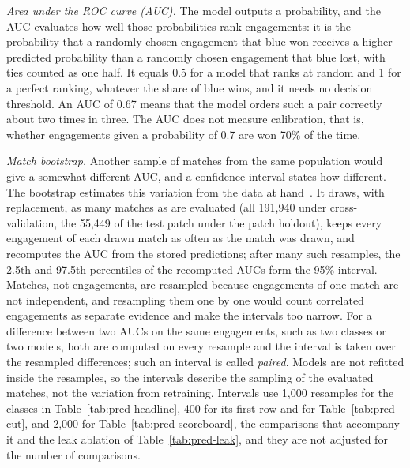 \emph{Area under the ROC curve (AUC).} The model outputs a probability, and the AUC evaluates how well
those probabilities rank engagements: it is the probability that a randomly chosen engagement that blue
won receives a higher predicted probability than a randomly chosen engagement that blue lost, with ties
counted as one half. It equals 0.5 for a model that ranks at random and 1 for a perfect ranking,
whatever the share of blue wins, and it needs no decision threshold. An AUC of 0.67 means that the model
orders such a pair correctly about two times in three. The AUC does not measure calibration, that is,
whether engagements given a probability of 0.7 are won 70\% of the time.

\emph{Match bootstrap.} Another sample of matches from the same population would give a somewhat
different AUC, and a confidence interval states how different. The bootstrap estimates this variation
from the data at hand~\cite{efron1993bootstrap}. It draws, with replacement, as many matches as are
evaluated (all 191,940 under cross-validation, the 55,449 of the test patch under the patch holdout),
keeps every engagement of each drawn match as often as the match was drawn, and recomputes the AUC from
the stored predictions; after many such resamples, the 2.5th and 97.5th percentiles of the recomputed
AUCs form the 95\% interval. Matches, not engagements, are resampled because engagements of one match are
not independent, and resampling them one by one would count correlated engagements as
separate evidence and make the intervals too narrow. For a difference between two AUCs on the same
engagements, such as two classes or two models, both are computed on every resample and the interval is
taken over the resampled differences; such an interval is called \emph{paired}. Models are not refitted
inside the resamples, so the intervals describe the sampling of the evaluated matches, not the variation
from retraining. Intervals use 1,000 resamples for the classes in Table~\ref{tab:pred-headline}, 400 for
its first row and for Table~\ref{tab:pred-cut}, and 2,000 for Table~\ref{tab:pred-scoreboard}, the
comparisons that accompany it and the leak ablation of Table~\ref{tab:pred-leak}, and they are not adjusted
for the number of comparisons.

